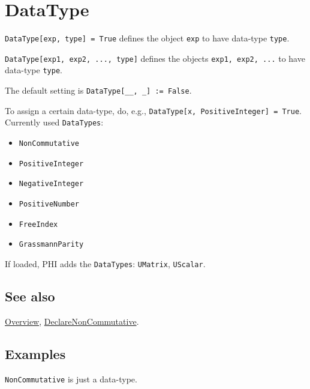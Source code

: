 \documentclass[../FeynCalcManual.tex]{subfiles}
\begin{document}
\hypertarget{datatype}{
\section{DataType}\label{datatype}}

\texttt{DataType[\allowbreak{}exp,\ \allowbreak{}type] = True} defines
the object \texttt{exp} to have data-type \texttt{type}.

\texttt{DataType[\allowbreak{}exp1,\ \allowbreak{}exp2,\ \allowbreak{}...,\ \allowbreak{}type]}
defines the objects \texttt{exp1,\ \allowbreak{}exp2,\ \allowbreak{}...}
to have data-type \texttt{type}.

The default setting is
\texttt{DataType[\allowbreak{}__,\ \allowbreak{}_] := False}.

To assign a certain data-type, do, e.g.,
\texttt{DataType[\allowbreak{}x,\ \allowbreak{}PositiveInteger] = True}.
Currently used \texttt{DataTypes}:

\begin{itemize}
\item
  \texttt{NonCommutative}
\item
  \texttt{PositiveInteger}
\item
  \texttt{NegativeInteger}
\item
  \texttt{PositiveNumber}
\item
  \texttt{FreeIndex}
\item
  \texttt{GrassmannParity}
\end{itemize}

If loaded, PHI adds the \texttt{DataTypes}: \texttt{UMatrix},
\texttt{UScalar}.

\subsection{See also}

\hyperlink{toc}{Overview},
\hyperlink{declarenoncommutative}{DeclareNonCommutative}.

\subsection{Examples}

\texttt{NonCommutative} is just a data-type.

\begin{Shaded}
\begin{Highlighting}[]
\OperatorTok{[}\OperatorTok{,} \OperatorTok{,}\OperatorTok{]} \ExtensionTok{=} \NormalTok{; }
 
 \ExtensionTok{=}  \SpecialCharTok{{-}}  
\end{Highlighting}
\end{Shaded}
\end{document}
